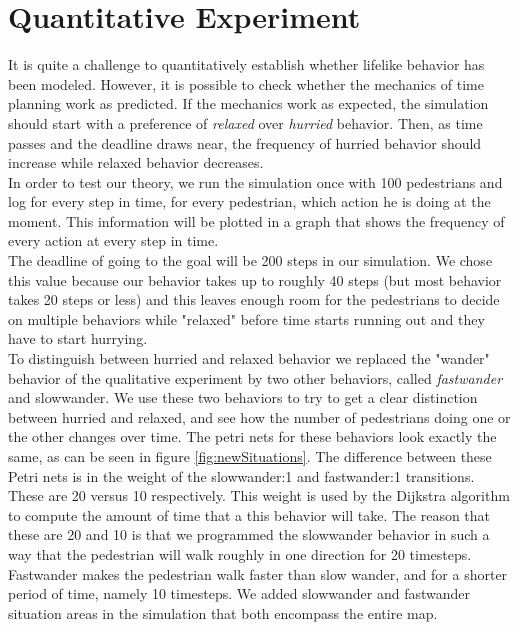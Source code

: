 \documentclass[11pt, a4paper]{book}
\begin{document}


\section{Quantitative Experiment}
It is quite a challenge to quantitatively establish whether lifelike behavior has been modeled. However, it is possible to check whether the mechanics of time planning work as predicted. If the mechanics work as expected, the simulation should start with a preference of \emph{relaxed} over \emph{hurried} behavior. Then, as time passes and the deadline draws near, the frequency of hurried behavior should increase while relaxed behavior decreases.\\
In order to test our theory, we run the simulation once with 100 pedestrians and log for every step in time, for every pedestrian, which action he is doing at the moment. This information will be plotted in a graph that shows the frequency of every action at every step in time.\\
The deadline of going to the goal will be 200 steps in our simulation. We chose this value because our behavior takes up to roughly 40 steps (but most behavior takes 20 steps or less) and this leaves enough room for the pedestrians to decide on multiple behaviors while "relaxed" before time starts running out and they have to start hurrying.\\
To distinguish between hurried and relaxed behavior we replaced the "wander" behavior of the qualitative experiment by two other behaviors, called \emph{fastwander} and {slowwander}. We use these two behaviors to try to get a clear distinction between hurried and relaxed, and see how the number of pedestrians doing one or the other changes over time. The petri nets for these behaviors look exactly the same, as can be seen in figure \ref{fig:newSituations}. The difference between these Petri nets is in the weight of the slowwander:1 and fastwander:1 transitions. These are 20 versus 10 respectively. This weight is used by the Dijkstra algorithm to compute the amount of time that a this behavior will take. The reason that these are 20 and 10 is that we programmed the slowwander behavior in such a way that the pedestrian will walk roughly in one direction for 20 timesteps. Fastwander makes the pedestrian walk faster than slow wander, and for a shorter period of time, namely 10 timesteps. We added slowwander and fastwander situation areas in the simulation that both encompass the entire map.\\
\end{document}
